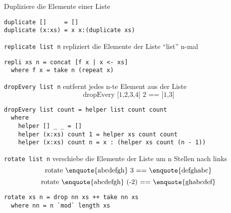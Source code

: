 Dupliziere die Elemente einer Liste
\begin{lstlisting}
duplicate []     = []
duplicate (x:xs) = x x:(duplicate xs)
\end{lstlisting}

\texttt{replicate list n} repliziert die Elemente der Liste \enquote{list} n-mal
\begin{lstlisting}
repli xs n = concat [f x | x <- xs]
  where f x = take n (repeat x)
\end{lstlisting}

\texttt{dropEvery list n} entfernt jedes n-te Element aus der Liste
$$\text{dropEvery [1,2,3,4] 2 == [1,3]}$$
\begin{lstlisting}
dropEvery list count = helper list count count
  where 
    helper [] _ _ = []
    helper (x:xs) count 1 = helper xs count count
    helper (x:xs) count n = x : (helper xs count (n - 1))
\end{lstlisting}

\texttt{rotate list n} verschiebe die Elemente der Liste um n Stellen nach links
$$\text{rotate \enquote{abcdefgh} 3 == \enquote{defghabc}}$$
$$\text{rotate \enquote{abcdefgh} (-2) == \enquote{ghabcdef}}$$
\begin{lstlisting}
rotate xs n = drop nn xs ++ take nn xs
  where nn = n `mod` length xs
\end{lstlisting}
